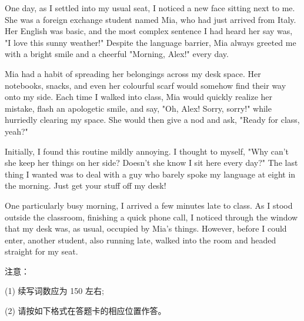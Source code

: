 \documentclass{英语试卷}
\begin{document}
\par One day, as I settled into my usual seat, I noticed a new face sitting next to me. She was a foreign exchange student named Mia, who had just arrived from Italy. Her English was basic, and the most complex sentence I had heard her say was, "I love this sunny weather!" Despite the language barrier, Mia always greeted me with a bright smile and a cheerful "Morning, Alex!" every day.\par
\par Mia had a habit of spreading her belongings across my desk space. Her notebooks, snacks, and even her colourful scarf would somehow find their way onto my side. Each time I walked into class, Mia would quickly realize her mistake, flash an apologetic smile, and say, "Oh, Alex! Sorry, sorry!" while hurriedly clearing my space. She would then give a nod and ask, "Ready for class, yeah?"\par
\par Initially, I found this routine mildly annoying. I thought to myself, "Why can't she keep her things on her side? Doesn't she know I sit here every day?" The last thing I wanted was to deal with a guy who barely spoke my language at eight in the morning. Just get your stuff off my desk!\par
\par One particularly busy morning, I arrived a few minutes late to class. As I stood outside the classroom, finishing a quick phone call, I noticed through the window that my desk was, as usual, occupied by Mia's things. However, before I could enter, another student, also running late, walked into the room and headed straight for my seat.\par
\par 注意：\par
\par (1) 续写词数应为 150 左右;\par
\par (2) 请按如下格式在答题卡的相应位置作答。\par
{}
\end{document}
